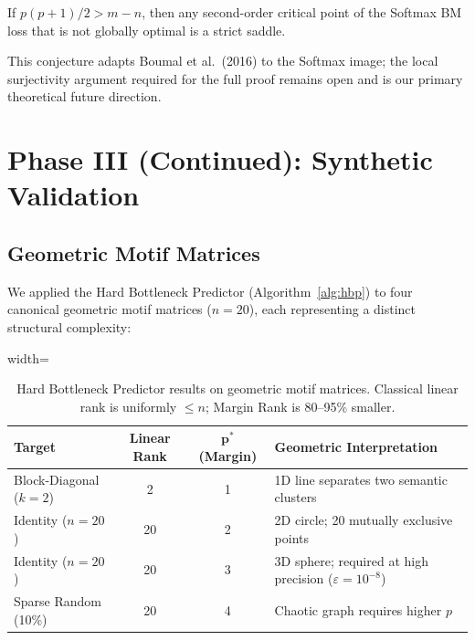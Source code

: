 \begin{conjecture}
  \label{conj:strict_saddle}
  If $p(p+1)/2 > m - n$, then any second-order critical point of the Softmax BM loss that
  is not globally optimal is a strict saddle.
\end{conjecture}

This conjecture adapts Boumal et al.\ (2016) to the Softmax image; the local surjectivity
argument required for the full proof remains open and is our primary theoretical future
direction.

\section{Phase III (Continued): Synthetic Validation}
\label{sec:synthetic}

\subsection{Geometric Motif Matrices}

We applied the Hard Bottleneck Predictor (Algorithm~\ref{alg:hbp}) to four canonical
geometric motif matrices ($n = 20$), each representing a distinct structural complexity:

\begin{table}[H]
  \centering
  \begin{adjustbox}{width=\columnwidth}
  \begin{tabular}{lccl}
    \toprule
    \textbf{Target} & \textbf{Linear Rank} & $\boldsymbol{p^*}$ (Margin) & \textbf{Geometric Interpretation} \\
    \midrule
    Block-Diagonal ($k=2$) & 2  & 1 & 1D line separates two semantic clusters \\
    Identity ($n=20$)      & 20 & 2 & 2D circle; 20 mutually exclusive points \\
    Identity ($n=20$)      & 20 & 3 & 3D sphere; required at high precision ($\varepsilon=10^{-8}$) \\
    Sparse Random (10\%)   & 20 & 4 & Chaotic graph requires higher $p$ \\
    \bottomrule
  \end{tabular}
  \end{adjustbox}
  \caption{Hard Bottleneck Predictor results on geometric motif matrices. Classical linear
  rank is uniformly $\leq n$; Margin Rank is 80--95\% smaller.}
  \label{tab:motif_results}
\end{table}

